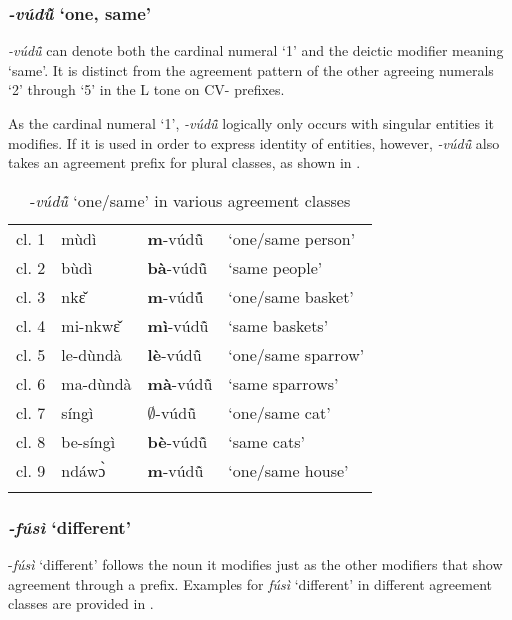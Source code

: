 \subsubsection{{\itshape -vúdũ̂} `one, same'} 
\label{sec:one}

{\itshape -vúdũ̂} can denote both the cardinal numeral `1' and the deictic modifier meaning `same'. It is distinct from the agreement pattern of the other agreeing numerals `2' through `5' in the L tone on CV- prefixes.

As the cardinal numeral `1', {\itshape -vúdũ̂} logically only occurs with singular entities it modifies. If it is used in order to express identity of entities, however, {\itshape -vúdũ̂} also takes an agreement prefix for plural classes, as shown in .

\begin{table}
\begin{tabular}{ll ll}
 \lsptoprule
cl. 1 & mùdì & {\bfseries m}-vúdũ̂  & `one/same person' \\
cl. 2 & bùdì & {\bfseries bà}-vúdũ̂ & `same people' \\
cl. 3 & nkɛ̌ & {\bfseries m}-vúdũ̂́ & `one/same basket' \\
cl. 4 & mi-nkwɛ̌ & {\bfseries mì}-vúdũ̂ & `same baskets' \\
cl. 5 & le-dùndà & {\bfseries lè}-vúdũ̂ & `one/same sparrow' \\
cl. 6 & ma-dùndà & {\bfseries mà}-vúdũ̂ &  `same sparrows' \\
cl. 7 & síngì & {\bfseries $\emptyset$}-vúdũ̂ & `one/same cat' \\
cl. 8 & be-síngì & {\bfseries bè}-vúdũ̂ & `same cats' \\
cl. 9 & ndáwɔ̀ & {\bfseries m}-vúdũ̂ & `one/same house' \\
 \lspbottomrule
\end{tabular}
\caption{{\AGR}-{\itshape vúdũ̂} `one/same' in various agreement classes}
\label{Tab:same}
\end{table}


\subsubsection{{\itshape -fúsì} `different'} 
-{\itshape fúsì} `different' follows the noun it modifies just as the other modifiers that show agreement through a prefix.  Examples for {\itshape fúsì} `different' in different agreement classes are provided in .

